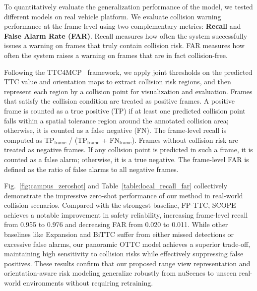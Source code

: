 \documentclass[journal]{IEEEtran}
\begin{document}
To quantitatively evaluate the generalization performance of the model, we tested different models on real vehicle platform. We evaluate collision warning performance at the frame level using two complementary metrics: \textbf{Recall} and \textbf{False Alarm Rate (FAR)}. Recall measures how often the system successfully issues a warning on frames that truly contain collision risk. FAR measures how often the system raises a warning on frames that are in fact collision-free.

Following the TTC4MCP~\cite{li2023ttc4mcp} framework, we apply joint thresholds on the predicted TTC value and orientation maps to extract collision risk regions, and then represent each region by a collision point for visualization and evaluation. Frames that satisfy the collision condition are treated as positive frames. A positive frame is counted as a true positive (TP) if at least one predicted collision point falls within a spatial tolerance region around the annotated collision area; otherwise, it is counted as a false negative (FN). The frame-level recall is computed as TP\(_\text{frame}\) / (TP\(_\text{frame}\) + FN\(_\text{frame}\)).
Frames without collision risk are treated as negative frames. If any collision point is predicted in such a frame, it is counted as a false alarm; otherwise, it is a true negative. The frame-level FAR is defined as the ratio of false alarms to all negative frames. 

Fig.~\ref{fig:campus_zeroshot} and Table~\ref{table:local_recall_far} collectively demonstrate the impressive zero-shot performance of our method in real-world collision scenarios. Compared with the strongest baseline, FP-TTC, SCOPE achieves a notable improvement in safety reliability, increasing frame-level recall from 0.955 to 0.976 and decreasing FAR from 0.020 to 0.011. While other baselines like Expansion and BiTTC suffer from either missed detections or excessive false alarms, our panoramic OTTC model achieves a superior trade-off, maintaining high sensitivity to collision risks while effectively suppressing false positives. These results confirm that our proposed range view representation and orientation-aware risk modeling generalize robustly from nuScenes to unseen real-world environments without requiring retraining.
\end{document}
